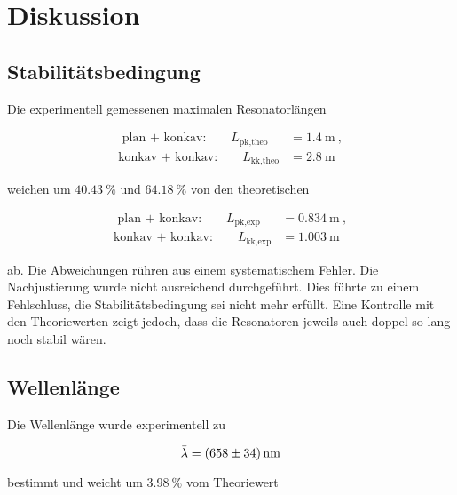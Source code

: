 \vspace{150pt}

\section{Diskussion}
\label{sec:Diskussion}


\subsection{Stabilitätsbedingung}

Die experimentell gemessenen maximalen Resonatorlängen

\vspace{-15pt}
\begin{align*}
    \text{  plan + konkav:} \qquad L_\text{pk,theo} &= \SI{1.4}{\meter} \: ,\\
    \text{konkav + konkav:} \qquad L_\text{kk,theo} &= \SI{2.8}{\meter}
\end{align*}

weichen um $\SI{40.43}{\percent}$ und $\SI{64.18}{\percent}$ von den theoretischen 

\vspace{-15pt}
\begin{align*}
    \text{  plan + konkav:} \qquad L_\text{pk,exp} &= \SI{0.834}{\meter} \: ,\\
    \text{konkav + konkav:} \qquad L_\text{kk,exp} &= \SI{1.003}{\meter} \: 
\end{align*}

ab. Die Abweichungen rühren aus einem systematischem Fehler.
Die Nachjustierung wurde nicht ausreichend durchgeführt.
Dies führte zu einem Fehlschluss, die Stabilitätsbedingung sei nicht mehr erfüllt.
Eine Kontrolle mit den Theoriewerten zeigt jedoch, dass die Resonatoren jeweils
auch doppel so lang noch stabil wären.

\subsection{Wellenlänge}

Die Wellenlänge wurde experimentell zu

\vspace{-5pt}
\begin{equation*}
    \bar{\lambda} = \SI{658 +- 34}{\nano\meter}
\end{equation*}

bestimmt und weicht um $\SI{3.98}{\percent}$ vom Theoriewert

